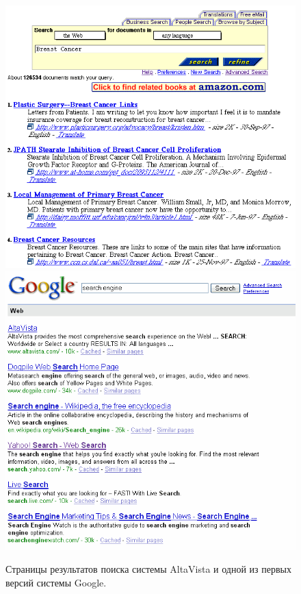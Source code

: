 \documentclass[12pt,a4paper]{report}
\begin{document}
\begin{figure}[]
  \centering
  \includegraphics[height=0.3\textheight]{pics/AltavistaResults.png}
  \includegraphics[height=0.3\textheight]{pics/Google-EarlyResults.png}
  \caption{Страницы результатов поиска системы AltaVista и одной из первых версий системы Google.}
  \label{early-search-engines}
\end{figure}
\end{document}
